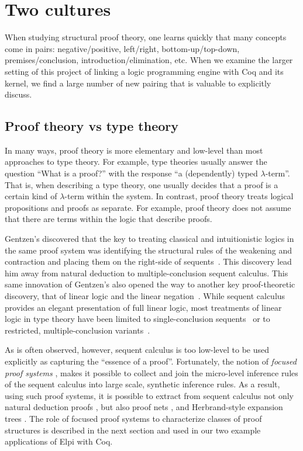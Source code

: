 \section{Two cultures}

When studying structural proof theory, one learns quickly that many
concepts come in pairs: negative/positive, left/right,
bottom-up/top-down, premises/conclusion, introduction/elimination,
etc.  When we examine the larger setting of this project of linking a
logic programming engine with Coq and its kernel, we find a large
number of new pairing that is valuable to explicitly discuss.

\subsection{Proof theory vs type theory}

In many ways, proof theory is more elementary and low-level than most
approaches to type theory.  For example, type theories usually answer
the question ``What is a proof?'' with the response ``a (dependently)
typed $\lambda$-term''.  That is, when describing a type theory, one
usually decides that a proof is a certain kind of $\lambda$-term
within the system.  In contrast, proof theory treats logical
propositions and proofs as separate.  For example, proof theory does
not assume that there are terms within the logic that describe proofs.


Gentzen's discovered that the key to treating classical and
intuitionistic logics in the same proof system was identifying the
structural rules of the weakening and contraction and placing them on
the right-side of sequents~\cite{gentzen35}.  This discovery lead him
away from natural deduction to multiple-conclusion sequent calculus.
%
This same innovation of Gentzen's also opened the way to
another key proof-theoretic discovery, that of linear logic
and the linear negation~\cite{girard87tcs}.
%
While sequent calculus provides an elegant presentation of full linear
logic, most treatments of linear logic in type theory have
been limited to single-conclusion sequents~\cite{bierman95phd}
or to restricted, multiple-conclusion variants~\cite{hyland93apal}.

As is often observed, however, sequent calculus is too low-level to be
used explicitly as capturing the ``essence of a proof''.  Fortunately,
the notion of \emph{focused proof systems}
\cite{andreoli92jlc,liang09tcs}, makes it possible to collect and join
the micro-level inference rules of the sequent calculus into large
scale, synthetic inference rules.  As a result, using such proof
systems, it is possible to extract from sequent calculus not only
natural deduction proofs \cite{pimentel16lsfa}, but also proof nets
\cite{chaudhuri08tcs}, and Herbrand-style expansion trees
\cite{chaudhuri16jlc}.  The role of focused proof systems to
characterize classes of proof structures is described in the next
section and used in our two example applications of Elpi with Coq.

